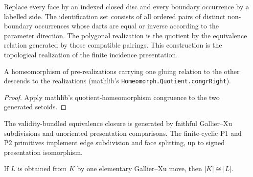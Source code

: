 \begin{definition}
\label{moise:def:polygonal_occurrence_adapter}
\leanok
{}
Replace every face by an indexed closed disc and every boundary occurrence by
a labelled side. The identification set consists of all ordered pairs of
distinct non-boundary occurrences whose darts are equal or inverse according
to the parameter direction. The polygonal realization is the quotient by the
equivalence relation generated by those compatible pairings. This construction
is the topological realization of the finite incidence presentation.
\end{definition}

\begin{lemma}
\label{moise:lem:cell_realization_quotient_congr}
\leanok
{}
A homeomorphism of pre-realizations carrying one gluing relation to the other
descends to the realizations (mathlib's
\texttt{Homeomorph.Quotient.congrRight}).
\end{lemma}

\begin{proof}
\leanok
Apply mathlib's quotient-homeomorphism congruence to the two generated setoids.
\end{proof}

\begin{definition}
\label{moise:def:gx_elementary_moves}
\leanok
{}
The validity-bundled equivalence closure is generated by faithful
Gallier--Xu subdivisions and unoriented presentation comparisons. The
finite-cyclic P1 and P2 primitives implement edge subdivision and face
splitting, up to signed presentation isomorphism.
\end{definition}

\begin{lemma}
\label{moise:lem:elementary_moves_preserve_realization}
\leanok
{}
If $L$ is obtained from $K$ by one elementary Gallier--Xu move, then
$|K|\cong|L|$.
\end{lemma}

